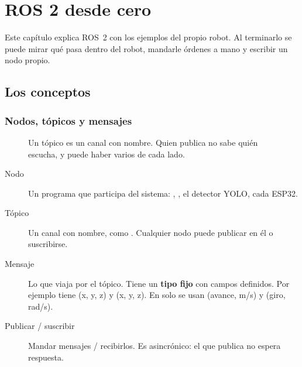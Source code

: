 \chapter{ROS 2 desde cero}\label{cap:ros2}

Este capítulo explica ROS~2 con los ejemplos del propio robot. Al terminarlo se puede mirar qué pasa dentro del
robot, mandarle órdenes a mano y escribir un nodo propio.

\section{Los conceptos}

\subsection{Nodos, tópicos y mensajes}

\begin{figure}[H]
\centering
{}
\caption{Un tópico es un canal con nombre. Quien publica no sabe quién escucha, y puede haber varios de cada lado.}
\end{figure}

\begin{description}
  \item[Nodo] Un programa que participa del sistema: , , el detector YOLO, cada ESP32.
  \item[Tópico] Un canal con nombre, como . Cualquier nodo puede publicar en él o suscribirse.
  \item[Mensaje] Lo que viaja por el tópico. Tiene un \textbf{tipo fijo} con campos definidos. Por ejemplo
         tiene  (x, y, z) y  (x, y, z). En 
        solo se usan  (avance, m/s) y  (giro, rad/s).
  \item[Publicar / suscribir] Mandar mensajes / recibirlos. Es asincrónico: el que publica no espera respuesta.
\end{description}

